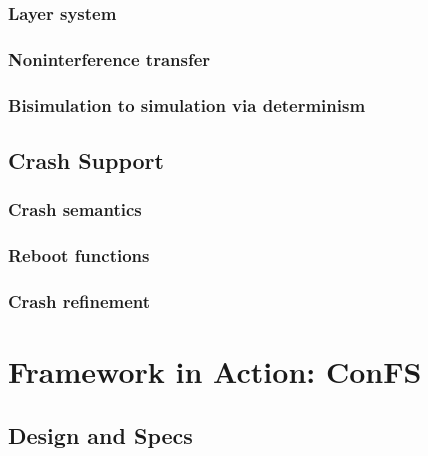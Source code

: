 \documentclass[onecolumn]{paper}
\begin{document}
		\subsubsection{Layer system}
		\subsubsection{Noninterference transfer}
		\subsubsection{Bisimulation to simulation via determinism}

	\subsection{Crash Support}
		\subsubsection{Crash semantics} 
		\subsubsection{Reboot functions}
		\subsubsection{Crash refinement}
\newpage
\section{Framework in Action: ConFS}
	\subsection{Design and Specs}
\end{document}
